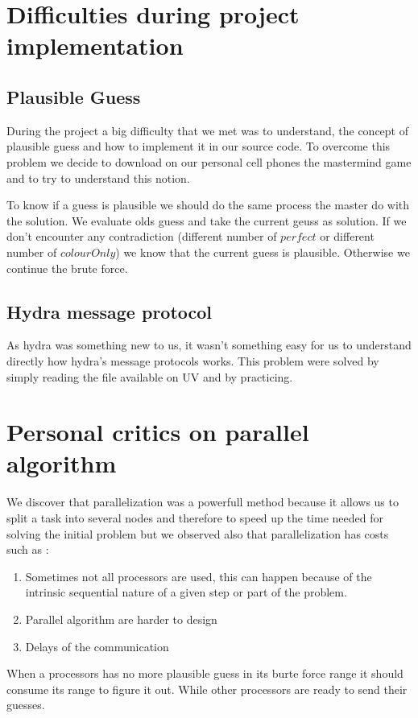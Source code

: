 \section{Difficulties during project implementation}
\subsection{Plausible Guess}
During the project a big difficulty that we met was to understand, the concept of plausible guess and how to implement it in our source code.  To overcome this problem we decide to download on our personal cell phones the mastermind game and to try to understand this notion.

To know if a guess is plausible we should do the same process the master do with the solution.
We evaluate olds guess and take the current geuss as solution. If we don't encounter any contradiction
(different number of $perfect$ or different number of $colourOnly$) we know that the current
guess is plausible. Otherwise we continue the brute force.

\subsection{Hydra message protocol}
As hydra was something new to us, it wasn't something easy for us to understand directly how hydra's message protocols works. This problem were solved by simply reading the file available on UV and by practicing. 



\section{Personal critics on parallel algorithm}
We discover that parallelization was a powerfull method because it allows us to split a task into several nodes and therefore to speed up the time needed for solving the initial problem but we observed also that parallelization has costs such as :
\begin{enumerate}
    \item Sometimes not all processors are used, this can happen because of the intrinsic sequential nature of a given step or part of the problem.
    \item Parallel algorithm are harder to design 
    \item Delays of the communication 
\end{enumerate}

When a processors has no more plausible guess in its burte force range it should
consume its range to figure it out. While other processors are ready to send their guesses.

